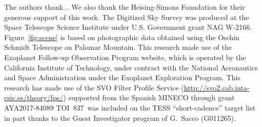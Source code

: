 \documentclass[12pt,twocolumn,tighten]{aastex63}
\newcommand{\tn}{TOI~837} %
\begin{document}
\acknowledgements
%
%
%
The authors thank...
%
We also thank the Heising-Simons Foundation for
their generous support of this work.
%
The Digitized Sky Survey was produced at the Space Telescope Science
Institute under U.S. Government grant NAG W-2166.
Figure~\ref{fig:scene} is based on photographic data obtained using
the Oschin Schmidt Telescope on Palomar Mountain.
%
This research made use of the Exoplanet Follow-up Observation
Program website, which is operated by the California Institute of
Technology, under contract with the National Aeronautics and Space
Administration under the Exoplanet Exploration Program.
%
This research has made use of the SVO Filter Profile Service
(\url{http://svo2.cab.inta-csic.es/theory/fps/}) supported from the Spanish
MINECO through grant AYA2017-84089
%
\tn\ was included on the TESS ``short-cadence'' target list in part
thanks to the Guest Investigator program of G.\ Sacco (G011265).
\end{document}
